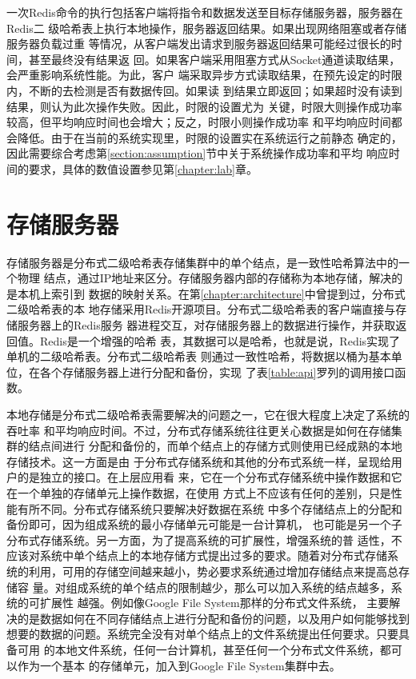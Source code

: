 一次Redis命令的执行包括客户端将指令和数据发送至目标存储服务器，服务器在Redis二
级哈希表上执行本地操作，服务器返回结果。如果出现网络阻塞或者存储服务器负载过重
等情况，从客户端发出请求到服务器返回结果可能经过很长的时间，甚至最终没有结果返
回。如果客户端采用阻塞方式从Socket通道读取结果，会严重影响系统性能。为此，客户
端采取异步方式读取结果，在预先设定的时限内，不断的去检测是否有数据传回。如果读
到结果立即返回；如果超时没有读到结果，则认为此次操作失败。因此，时限的设置尤为
关键，时限大则操作成功率较高，但平均响应时间也会增大；反之，时限小则操作成功率
和平均响应时间都会降低。由于在当前的系统实现里，时限的设置实在系统运行之前静态
确定的，因此需要综合考虑第\ref{section:assumption}节中关于系统操作成功率和平均
响应时间的要求，具体的数值设置参见第\ref{chapter:lab}章。

\section{存储服务器}\label{section:redis}
存储服务器是分布式二级哈希表存储集群中的单个结点，是一致性哈希算法中的一个物理
结点，通过IP地址来区分。存储服务器内部的存储称为本地存储，解决的是本机上索引到
数据的映射关系。在第\ref{chapter:architecture}中曾提到过，分布式二级哈希表的本
地存储采用Redis开源项目。分布式二级哈希表的客户端直接与存储服务器上的Redis服务
器进程交互，对存储服务器上的数据进行操作，并获取返回值。Redis是一个增强的哈希
表，其数据可以是哈希，也就是说，Redis实现了单机的二级哈希表。分布式二级哈希表
则通过一致性哈希，将数据以桶为基本单位，在各个存储服务器上进行分配和备份，实现
了表\ref{table:api}罗列的调用接口函数。

本地存储是分布式二级哈希表需要解决的问题之一，它在很大程度上决定了系统的吞吐率
和平均响应时间。不过，分布式存储系统往往更关心数据是如何在存储集群的结点间进行
分配和备份的，而单个结点上的存储方式则使用已经成熟的本地存储技术。这一方面是由
于分布式存储系统和其他的分布式系统一样，呈现给用户的是独立的接口。在上层应用看
来，它在一个分布式存储系统中操作数据和它在一个单独的存储单元上操作数据，在使用
方式上不应该有任何的差别，只是性能有所不同。分布式存储系统只要解决好数据在系统
中多个存储结点上的分配和备份即可，因为组成系统的最小存储单元可能是一台计算机，
也可能是另一个子分布式存储系统。另一方面，为了提高系统的可扩展性，增强系统的普
适性，不应该对系统中单个结点上的本地存储方式提出过多的要求。随着对分布式存储系
统的利用，可用的存储空间越来越小，势必要求系统通过增加存储结点来提高总存储容
量。对组成系统的单个结点的限制越少，那么可以加入系统的结点越多，系统的可扩展性
越强。例如像Google File System\cite{ghemawat2003google}那样的分布式文件系统，
主要解决的是数据如何在不同存储结点上进行分配和备份的问题，以及用户如何能够找到
想要的数据的问题。系统完全没有对单个结点上的文件系统提出任何要求。只要具备可用
的本地文件系统，任何一台计算机，甚至任何一个分布式文件系统，都可以作为一个基本
的存储单元，加入到Google File System集群中去。

